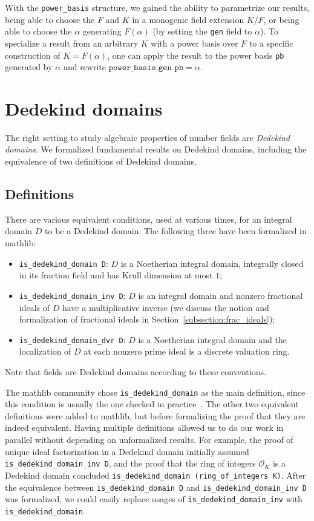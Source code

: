 \documentclass[sn-mathphys]{sn-jnl}%
\newcommand{\lean}[1]{\texttt{#1}\xspace}
\newcommand*{\OK}[1][K]{\mathcal{O}_{#1}}
\newcommand{\mathlib}{\textsf{mathlib}\xspace}
\begin{document}
With the \lean{power\_basis} structure, we gained the ability to parametrize our results,
being able to choose the $F$ and $K$ in a monogenic field extension $K / F$,
or being able to choose the $\alpha$ generating $F(\alpha)$ (by setting the \lean{gen} field to $\alpha$).
To specialize a result from an arbitrary $K$ with a power basis over $F$ to a specific construction of $K = F(\alpha)$,
one can apply the result to the power basis \lean{pb} generated by $\alpha$ and rewrite $\lean{power\_basis.gen pb} = \alpha$.


\section{Dedekind domains} \label{sec:Dedekind-domain}
The right setting to study algebraic properties of number fields are \emph{Dedekind domains}.
We formalized fundamental results on Dedekind domains, including the equivalence of two definitions of Dedekind domains.

\subsection{Definitions}\label{subsec:definitions_DD}
There are various equivalent conditions, used at various times, for an integral domain $D$ to be a Dedekind domain.
The following three have been formalized in \mathlib:
\begin{itemize}
\item \lean{is\_dedekind\_domain D}: $D$ is a Noetherian integral domain, integrally closed in its fraction field and has Krull dimension at most $1$;
\item \lean{is\_dedekind\_domain\_inv D}: $D$ is an integral domain and nonzero fractional ideals of $D$ have a multiplicative inverse (we discuss the notion and formalization of fractional ideals in Section~\ref{subsection:frac_ideals});
\item \lean{is\_dedekind\_domain\_dvr D}: $D$ is a Noetherian integral domain and the localization of $D$ at each nonzero prime ideal is a discrete valuation ring.
\end{itemize}
Note that fields are Dedekind domains according to these conventions.

The mathlib community chose \lean{is\_dedekind\_domain} as the main definition,
since this condition is usually the one checked in practice~\cite{Neukirch}.
The other two equivalent definitions were added to \mathlib, but before formalizing the proof that they are indeed equivalent.
Having multiple definitions allowed us to do our work in parallel without depending on unformalized results.
For example,
the proof of unique ideal factorization in a Dedekind domain initially assumed \lean{is\_dedekind\_domain\_inv D},
and the proof that the ring of integers $\OK$ is a Dedekind domain concluded \lean{is\_dedekind\_domain (ring\_of\_integers K)}.
After the equivalence between \lean{is\_dedekind\_domain D} and \lean{is\_dedekind\_domain\_inv D} was formalized,
we could easily replace usages of \lean{is\_dedekind\_domain\_inv} with \lean{is\_dedekind\_domain}.
\end{document}
